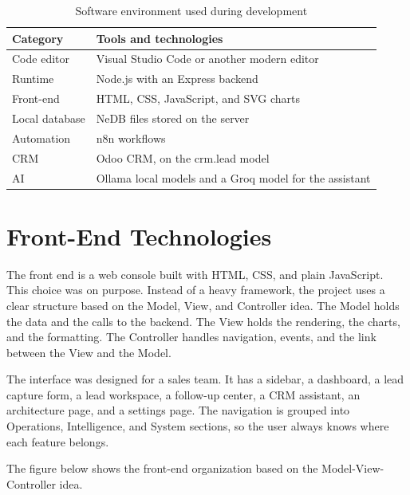 \documentclass[12pt,a4paper,oneside]{report}
\begin{document}
\begin{table}[H]
\centering
\begin{tabularx}{\textwidth}{|p{4cm}|X|}
\hline\rowcolor{TabHead}
\textbf{Category} & \textbf{Tools and technologies} \\
\hline
Code editor & Visual Studio Code or another modern editor \\
\hline
Runtime & Node.js with an Express backend \\
\hline
Front-end & HTML, CSS, JavaScript, and SVG charts \\
\hline
Local database & NeDB files stored on the server \\
\hline
Automation & n8n workflows \\
\hline
CRM & Odoo CRM, on the crm.lead model \\
\hline
AI & Ollama local models and a Groq model for the assistant \\
\hline
\end{tabularx}
\caption{Software environment used during development}
\end{table}

\section{Front-End Technologies}\label{sumlbl:c4s3}
The front end is a web console built with HTML, CSS, and plain JavaScript. This choice was on purpose. Instead of a heavy framework, the project uses a clear structure based on the Model, View, and Controller idea. The Model holds the data and the calls to the backend. The View holds the rendering, the charts, and the formatting. The Controller handles navigation, events, and the link between the View and the Model.

The interface was designed for a sales team. It has a sidebar, a dashboard, a lead capture form, a lead workspace, a follow-up center, a CRM assistant, an architecture page, and a settings page. The navigation is grouped into Operations, Intelligence, and System sections, so the user always knows where each feature belongs.

The figure below shows the front-end organization based on the Model-View-Controller idea.
\end{document}
